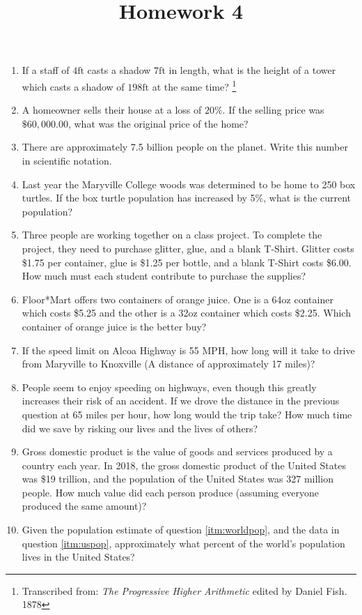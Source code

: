 \documentclass{article}
\title{Homework 4}
\date{}
\begin{document}
\maketitle

\begin{enumerate}
  \item If a staff of $4\mathrm{ft}$ casts a shadow $7\mathrm{ft}$ in length,
      what is the height of a tower which casts a shadow of $198\mathrm{ft}$ at
      the same time? \footnote{Transcribed from: {\em The Progressive Higher
      Arithmetic} edited by Daniel Fish. 1878\label{fn:higher}}
  \item A homeowner sells their house at a loss of $20\%$. If the selling
      price was $\$60,000.00$, what was the original price of the home?
  \item There are approximately 7.5 billion people on the planet. Write this
      number in scientific notation.\label{itm:worldpop}
  \item Last year the Maryville College woods was determined to be home to
      250 box turtles. If the box turtle population has increased by 5\%, what is
      the current population?
  \item Three people are working together on a class project. To complete the
      project, they need to purchase glitter, glue, and a blank T-Shirt. Glitter
      costs \$1.75 per container, glue is \$1.25 per bottle, and a blank T-Shirt
      costs \$6.00. How much must each student contribute to purchase the
      supplies?
  \item Floor*Mart offers two containers of orange juice. One is a 64oz
      container which costs \$5.25 and the other is a 32oz container which costs
      \$2.25. Which container of orange juice is the better buy?
  \item If the speed limit on Alcoa Highway is 55 MPH, how long will it take
      to drive from Maryville to Knoxville (A distance of approximately 17
      miles)?
  \item People seem to enjoy speeding on highways, even though this greatly
      increases their risk of an accident. If we drove the distance in the
      previous question at 65 miles per hour, how long would the trip take? How
      much time did we save by risking our lives and the lives of others?
  \item Gross domestic product is the value of goods and services produced by
      a country each year. In 2018, the gross domestic product of the United
      States was \$19 trillion, and the population of the United States was 327
      million people. How much value did each person produce (assuming everyone
      produced the same amount)? \label{itm:uspop}
  \item Given the population estimate of question \ref{itm:worldpop}, and the
      data in question \ref{itm:uspop}, approximately what percent of the world's
      population lives in the United States?
\end{enumerate}
\end{document}
